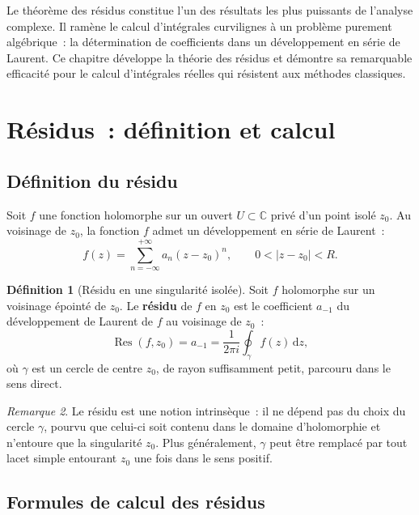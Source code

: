\documentclass[12pt,a4paper,openany]{book}
\theoremstyle{definition}
\newtheorem{definition}{Définition}[chapter]
\theoremstyle{plain}
\theoremstyle{remark}
\newtheorem{remarque}[definition]{Remarque}
\newcommand{\C}{\mathbb{C}}
\DeclareMathOperator{\Res}{Res}
\newcommand{\dd}{\mathrm{d}}
\newcommand{\abs}[1]{\left|#1\right|}
\begin{document}
\minitoc
\vspace{1em}

Le théorème des résidus constitue l'un des résultats les plus puissants de l'analyse
complexe. Il ramène le calcul d'intégrales curvilignes à un problème purement
algébrique~: la détermination de coefficients dans un développement en série de Laurent.
Ce chapitre développe la théorie des résidus et démontre sa remarquable efficacité
pour le calcul d'intégrales réelles qui résistent aux méthodes classiques.

\section{Résidus~: définition et calcul}\label{sec:residus-def}

\subsection{Définition du résidu}

Soit $f$ une fonction holomorphe sur un ouvert $U \subset \C$ privé d'un point
isolé $z_0$. Au voisinage de $z_0$, la fonction $f$ admet un développement en
série de Laurent~:
\[
  f(z) = \sum_{n=-\infty}^{+\infty} a_n (z - z_0)^n, \qquad 0 < \abs{z - z_0} < R.
\]

\begin{definition}[Résidu en une singularité isolée]\label{def:residu}
Soit $f$ holomorphe sur un voisinage épointé de $z_0$. Le \textbf{résidu} de $f$
en $z_0$ est le coefficient $a_{-1}$ du développement de Laurent de $f$ au
voisinage de $z_0$~:
\[
  \Res(f, z_0) = a_{-1} = \frac{1}{2\pi i} \oint_{\gamma} f(z)\, \dd z,
\]
où $\gamma$ est un cercle de centre $z_0$, de rayon suffisamment petit, parcouru
dans le sens direct.
\end{definition}

\begin{remarque}\label{rem:residu-intrinseque}
Le résidu est une notion intrinsèque~: il ne dépend pas du choix du cercle $\gamma$,
pourvu que celui-ci soit contenu dans le domaine d'holomorphie et n'entoure
que la singularité $z_0$. Plus généralement, $\gamma$ peut être remplacé par
tout lacet simple entourant $z_0$ une fois dans le sens positif.
\end{remarque}

\subsection{Formules de calcul des résidus}
\end{document}
